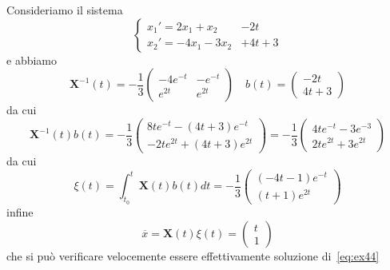 \begin{example} 
    Consideriamo il sistema
    \begin{equation}\label{eq:ex44}
      \begin{cases}
          x_{1}' = 2x_{1} + x_{2} &- 2t\\
          x_{2}' = -4x_{1} - 3x_{2} &+ 4t + 3
      \end{cases}
    \end{equation}
    e abbiamo
    \[
      \mathbf{X}^{-1} {(t)} = -\frac{1}{3} \begin{pmatrix}
          -4e^{-t} & -e^{-t} \\
          e^{2t} & e^{2t}
      \end{pmatrix}
      \quad 
      b{(t)} = \begin{pmatrix}
          -2t \\
          4t + 3
      \end{pmatrix}
    \]
    da cui
    \[
      \mathbf{X}^{-1}{(t)} b{(t)} = -\frac{1}{3} \begin{pmatrix}
          8te^{-t}-{(4t+3)}e^{-t} \\
          -2te^{2t} + {(4t+3)}e^{2t}
      \end{pmatrix}
      = -\frac{1}{3}
      \begin{pmatrix}
          4te^{-t}-3e^{-3}  \\
          2te^{2t}+3e^{2t}
      \end{pmatrix}
    \]
    da cui
    \[
        \xi {(t)} = \int_{t_{0}}^{t} \mathbf{X} {(t)} b{(t)} dt = -\frac{1}{3}
        \begin{pmatrix}
            {(-4t-1)}e^{-t} \\
            {(t+1)}e^{2t}
        \end{pmatrix}
    \]
    infine
    \[
      \overline{x} = \mathbf{X} {(t)}\xi {(t)} = \begin{pmatrix}
          t \\
          1
      \end{pmatrix}
    \] che si può verificare velocemente essere effettivamente soluzione
    di~\eqref{eq:ex44}
    
\end{example}


